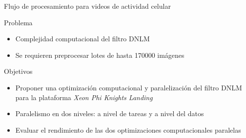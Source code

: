\documentclass[15pt]{beamer} %
\begin{document}
\begin{frame}{Flujo de procesamiento para videos de actividad celular}
\begin{center}
\end{center}
\end{frame}

\begin{frame}{Problema}
  
  \begin{itemize}
  \item Complejidad computacional del filtro DNLM
  \item Se requieren preprocesar lotes de hasta 170000 im\'agenes
  \end{itemize}
\end{frame}

\begin{frame}{Objetivos}
  \begin{itemize}
  \item Proponer una optimización computacional y paralelización del filtro DNLM  para la plataforma \textit{Xeon Phi Knights Landing}
  \vspace{3mm}
  \item Paralelismo en dos niveles: a nivel de tareas y a nivel del datos
  \vspace{3mm}
  \item Evaluar el rendimiento de las dos optimizaciones computacionales paralelas 
  \end{itemize}
\end{frame}
\end{document}
